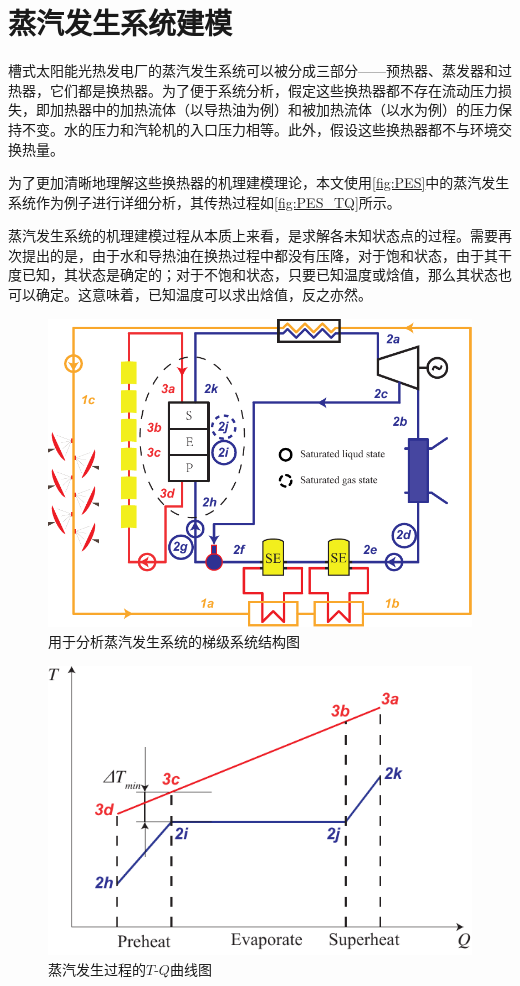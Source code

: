 \section{蒸汽发生系统建模}
槽式太阳能光热发电厂的蒸汽发生系统可以被分成三部分——预热器、蒸发器和过热器，它们都是换热器。为了便于系统分析，假定这些换热器都不存在流动压力损失，即加热器中的加热流体（以导热油为例）和被加热流体（以水为例）的压力保持不变。水的压力和汽轮机的入口压力相等。此外，假设这些换热器都不与环境交换热量。

为了更加清晰地理解这些换热器的机理建模理论，本文使用\autoref{fig:PES}中的蒸汽发生系统作为例子进行详细分析，其传热过程如\autoref{fig:PES_TQ}所示。

蒸汽发生系统的机理建模过程从本质上来看，是求解各未知状态点的过程。需要再次提出的是，由于水和导热油在换热过程中都没有压降，对于饱和状态，由于其干度已知，其状态是确定的；对于不饱和状态，只要已知温度或焓值，那么其状态也可以确定。这意味着，已知温度可以求出焓值，反之亦然。

\begin{figure}[ht!]
	\centering
	\includegraphics[width = 0.8\columnwidth]{fig/PES}
	\caption{用于分析蒸汽发生系统的梯级系统结构图}
	\label{fig:PES}
\end{figure}

\begin{figure}[ht!]
	\centering
	\includegraphics[width = 0.6\columnwidth]{fig/PES_TQ}
	\caption{蒸汽发生过程的$T$-$Q$曲线图}
	\label{fig:PES_TQ}
\end{figure}

